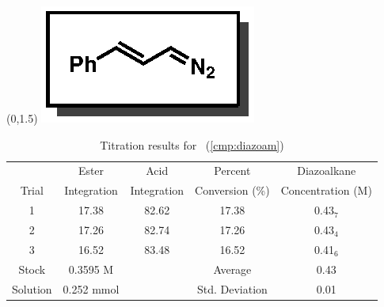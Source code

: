 \begin{singlespace}
\begin{table}[htbp]
\begin{textblock}{1}(0,1.5)
\includegraphics[scale=0.8]{chp_asymmetric/images/diazoam}
\end{textblock}
\flushright
{\small
\begin{tabular}{ccccc} 
\toprule
&Ester&Acid&Percent&Diazoalkane\\
Trial&Integration&Integration&Conversion (\%)&Concentration (M) \\ 
\midrule
1 & 17.38 & 82.62 & 17.38 & 0.43$_7$ \\
2 & 17.26 & 82.74 & 17.26 & 0.43$_4$ \\
3 & 16.52 & 83.48 & 16.52 & 0.41$_6$ \\
\midrule
Stock & 0.3595 M & & Average & 0.43 \\
Solution & 0.252 mmol & & Std. Deviation & 0.01 \\
\bottomrule
\end{tabular}
\caption{Titration results for \CMPdiazoam~(\ref{cmp:diazoam})}
}
\end{table}
\end{singlespace}


